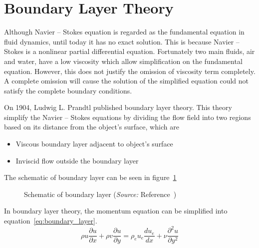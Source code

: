 \section{Boundary Layer Theory}
Although Navier -- Stokes equation is regarded as the fundamental equation in fluid dynamics, until today it has no exact solution. This is because Navier -- Stokes is a nonlinear partial differential equation. Fortunately two main fluids, air and water, have a low viscosity which allow simplification on the fundamental equation. However, this does not justify the omission of viscosity term completely. A complete omission will cause the solution of the simplified equation could not satisfy the complete boundary conditions. 

On 1904, Ludwig L. Prandtl published boundary layer theory. This theory simplify the Navier -- Stokes equations by dividing the flow field into two regions based on its distance from the object's surface, which are~\cite{JB}
\begin{itemize}
\item Viscous boundary layer adjacent to object's surface
\item Inviscid flow outside the boundary layer
\end{itemize}
The schematic of boundary layer can be seen in figure~\ref{fig:boundary_layer}
\begin{figure}[h]
  \centering
  \caption{Schematic of boundary layer (\emph{Source:} Reference~\cite{JA})}
  \label{fig:boundary_layer}
\end{figure}

In boundary layer theory, the momentum equation can be simplified into equation~\ref{eq:boundary_layer}.
\begin{equation}\label{eq:boundary_layer}
  \rho u\frac{\partial u}{\partial x}+\rho v\frac{\partial u}{\partial y} = \rho_eu_e\frac{du_e}{dx}+\nu\frac{\partial^2u}{\partial y^2}
\end{equation}

